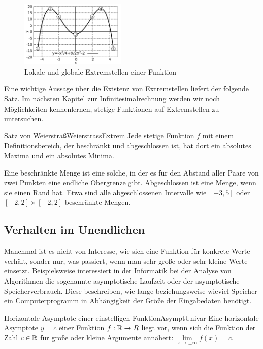 \begin{figure}
    \centering
    \includegraphics[width=0.45\textwidth]{./gnuplot/extreme-values-function}
    \caption{Lokale und globale Extremstellen einer Funktion}
    \label{fig:ExtrValFun}
\end{figure}

Eine wichtige Aussage über die Existenz von Extremstellen liefert der folgende Satz. Im nächsten Kapitel zur Infinitesimalrechnung werden wir noch Möglichkeiten kennenlernen, stetige Funktionen auf Extremstellen zu untersuchen.

\begin{statement}{Satz von Weierstraß}{WeierstrassExtrem}
    Jede stetige Funktion $f$ mit einem Definitionsbereich, der beschränkt und abgeschlossen ist, hat dort ein absolutes Maxima und ein absolutes Minima.
\end{statement}

Eine beschränkte Menge ist eine solche, in der es für den Abstand aller Paare von zwei Punkten eine endliche Obergrenze gibt. Abgeschlossen ist eine Menge, wenn sie einen Rand hat. Etwa sind alle abgeschlossenen Intervalle wie $[-3,5]$ oder $[-2,2]\times[-2,2]$ beschränkte Mengen.

\subsection{Verhalten im Unendlichen}

Manchmal ist es nicht von Interesse, wie sich eine Funktion für konkrete Werte verhält, sonder nur, was passiert, wenn man sehr große oder sehr kleine Werte einsetzt. Beispielsweise interessiert in der Informatik bei der Analyse von Algorithmen die sogenannte asymptotische Laufzeit oder der asymptotische Speicherverbrauch. Diese beschreiben, wie lange beziehungsweise wieviel Speicher ein Computerprogramm in Abhängigkeit der Größe der Eingabedaten benötigt.

\begin{definition}{Horizontale Asymptote einer einstelligen Funktion}{AsymptUnivar}
    Eine horizontale Asymptote $y=c$ einer Funktion $f: \mathbb{R} \to R$ liegt vor, wenn sich die Funktion der Zahl $c\in\mathbb{R}$ für große oder kleine Argumente annähert: $\lim\limits_{x\to\pm\infty} f(x) = c$.
\end{definition}

